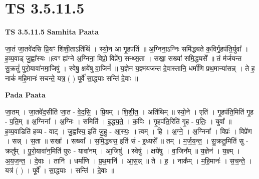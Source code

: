 \documentclass[17pt]{extarticle}
\begin{document}

\section{ TS 3.5.11.5 }

\textbf{TS 3.5.11.5 } \newline
\textbf{Samhita Paata} \newline

जा॒तं जा॒तवे॑दसि प्रि॒यꣳ शि॑शी॒ताऽति॑थिं । स्यो॒न आ गृ॒हप॑तिं ॥ अ॒ग्निना॒ऽग्निः समि॑द्ध्यते क॒विर्गृ॒हप॑ति॒र्युवा᳚ । ह॒व्य॒वाड् जु॒ह्वा᳚स्यः ॥त्वꣳ ह्य॑ग्ने अ॒ग्निना॒ विप्रो॒ विप्रे॑ण॒ सन्थ्स॒ता । सखा॒ सख्या॑ समि॒द्ध्यसे᳚ ॥ तं म॑र्जयन्त सु॒क्रतुं॑ पुरो॒यावा॑नमा॒जिषु॑ । स्वेषु॒ क्षये॑षु वा॒जिनं᳚ ॥ य॒ज्ञेन॑ य॒ज्ञ्म॑यजन्त दे॒वास्तानि॒ धर्मा॑णि प्रथ॒मान्या॑सन्न् । ते ह॒ नाकं॑ महि॒मानः॑ सचन्ते॒ यत्र॒ ( ) पूर्वे॑ सा॒द्ध्याः सन्ति॑ दे॒वाः ॥ \newline

\textbf{Pada Paata} \newline

जा॒तम् । जा॒तवे॑द॒सीति॑ जा॒त - वे॒द॒सि॒ । प्रि॒यम् । शि॒शी॒त॒ । अति॑थिम् ॥ स्यो॒ने । एति॑ । गृ॒हप॑ति॒मिति॑ गृ॒ह - प॒ति॒म् ॥ अ॒ग्निना᳚ । अ॒ग्निः । समिति॑ । इ॒द्ध्य॒ते॒ । क॒विः । गृ॒हप॑ति॒रिति॑ गृ॒ह - प॒तिः॒ । युवा᳚ ॥ ह॒व्य॒वाडिति॑ हव्य - वाट् । जु॒ह्वा᳚स्य॒ इति॑ जु॒हु - आ॒स्यः॒ ॥ त्वम् । हि । अ॒ग्ने॒ । अ॒ग्निना᳚ । विप्रः॑ । विप्रे॑ण । सन्न् । स॒ता ॥ सखा᳚ । सख्या᳚ । स॒मि॒द्ध्यस॒ इति॑ सं - इ॒ध्यसे᳚ ॥ तम् । म॒र्ज॒य॒न्त॒ । सु॒क्रतु॒मिति॑ सु - क्रतु᳚म् । पु॒रो॒यावा॑न॒मिति॑ पुरः - यावा॑नम् । आ॒जिषु॑ ॥ स्वेषु॑ । क्षये॑षु । वा॒जिन᳚म् ॥ य॒ज्ञेन॑ । य॒ज्ञ्म् । अ॒य॒ज॒न्त॒ । दे॒वाः । तानि॑ । धर्मा॑णि । प्र॒थ॒मानि॑ । आ॒स॒न्न् ॥ ते । ह॒ । नाक᳚म् । म॒हि॒मानः॑ । स॒च॒न्ते॒ । यत्र॑ ( ) । पूर्वे᳚ । सा॒द्ध्याः । सन्ति॑ । दे॒वाः ॥  \newline
\end{document}
